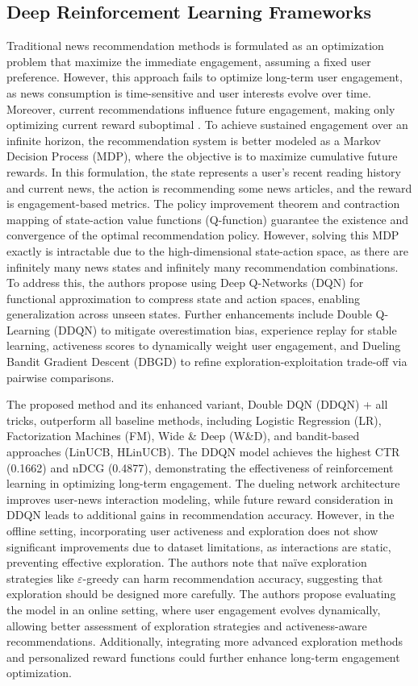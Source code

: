 \documentclass{ieeetj}
\begin{document}
\subsection{Deep Reinforcement Learning Frameworks}

Traditional news recommendation methods is formulated as an optimization problem that maximize the immediate engagement, assuming a fixed user preference. However, this approach fails to optimize long-term user engagement, as news consumption is time-sensitive and user interests evolve over time. Moreover, current recommendations influence future engagement, making only optimizing current reward suboptimal \cite{zheng_drn_2018}. To achieve sustained engagement over an infinite horizon, the recommendation system is better modeled as a Markov Decision Process (MDP), where the objective is to maximize cumulative future rewards. In this formulation, the state represents a user's recent reading history and current news, the action is recommending some news articles, and the reward is engagement-based metrics\cite{zheng_drn_2018}. The policy improvement theorem and contraction mapping of state-action value functions (Q-function) guarantee the existence and convergence of the optimal recommendation policy. However, solving this MDP exactly is intractable due to the high-dimensional state-action space, as there are infinitely many news states and infinitely many recommendation combinations. To address this, the authors propose using Deep Q-Networks (DQN) for functional approximation to compress state and action spaces, enabling generalization across unseen states\cite{zheng_drn_2018}. Further enhancements include Double Q-Learning (DDQN) to mitigate overestimation bias, experience replay for stable learning, activeness scores to dynamically weight user engagement, and Dueling Bandit Gradient Descent (DBGD) to refine exploration-exploitation trade-off via pairwise comparisons. 

The proposed method and its enhanced variant, Double DQN (DDQN) + all tricks, outperform all baseline methods, including Logistic Regression (LR), Factorization Machines (FM), Wide \& Deep (W\&D), and bandit-based approaches (LinUCB, HLinUCB). The DDQN model achieves the highest CTR (0.1662) and nDCG (0.4877), demonstrating the effectiveness of reinforcement learning in optimizing long-term engagement. The dueling network architecture improves user-news interaction modeling, while future reward consideration in DDQN leads to additional gains in recommendation accuracy. However, in the offline setting, incorporating user activeness and exploration does not show significant improvements due to dataset limitations, as interactions are static, preventing effective exploration. The authors note that na\"{i}ve exploration strategies like $\varepsilon$-greedy can harm recommendation accuracy, suggesting that exploration should be designed more carefully. The authors propose evaluating the model in an online setting, where user engagement evolves dynamically, allowing better assessment of exploration strategies and activeness-aware recommendations. Additionally, integrating more advanced exploration methods and personalized reward functions could further enhance long-term engagement optimization.
\end{document}
